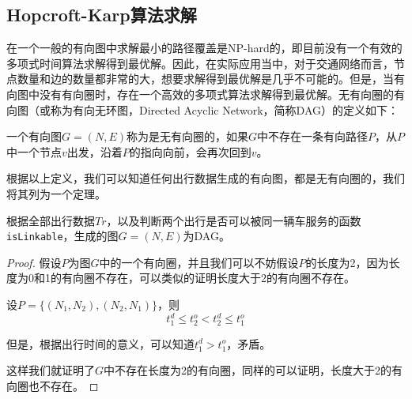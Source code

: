 \subsection{Hopcroft-Karp算法求解}
在一个一般的有向图中求解最小的路径覆盖是NP-hard的，即目前没有一个有效的多项式时间算法求解得到最优解。因此，在实际应用当中，对于交通网络而言，节点数量和边的数量都非常的大，想要求解得到最优解是几乎不可能的。但是，当有向图中没有有向圈时，存在一个高效的多项式算法求解得到最优解。无有向圈的有向图（或称为有向无环图，Directed Acyclic Network，简称DAG）的定义如下：
\begin{definition}[DAG]
一个有向图$G = (N,E)$称为是无有向圈的，如果$G$中不存在一条有向路径$P$，从$P$中一个节点$v$出发，沿着$P$的指向向前，会再次回到$v$。
\end{definition}
\par
根据以上定义，我们可以知道任何出行数据生成的有向图，都是无有向圈的，我们将其列为一个定理。
\begin{theorem}
根据全部出行数据$Tr$，以及判断两个出行是否可以被同一辆车服务的函数\texttt{isLinkable}，生成的图$G = (N,E)$为DAG。
\end{theorem}
\begin{proof}
假设$P$为图$G$中的一个有向圈，并且我们可以不妨假设$P$的长度为2，因为长度为0和1的有向圈不存在，可以类似的证明长度大于2的有向圈不存在。
\par
设$P = \{(N_1, N_2), (N_2, N_1)\}$，则
\[
  t_1^d \leq t_2^o < t_2^d \leq t_1^o
\]
\par
但是，根据出行时间的意义，可以知道$t_1^d > t_1^o$，矛盾。
\par
这样我们就证明了$G$中不存在长度为2的有向圈，同样的可以证明，长度大于2的有向圈也不存在。
\end{proof}

